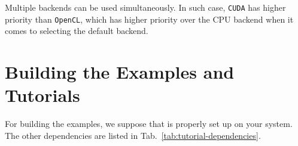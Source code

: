 
Multiple backends can be used simultaneously. In such case, \lstinline|CUDA| has higher priority than \lstinline|OpenCL|, which has higher priority over the CPU backend when it comes to selecting the default backend.


\section{Building the Examples and Tutorials}
For building the examples, we suppose that {\CMake} is properly set up
on your system. The other dependencies are listed in Tab.~\ref{tab:tutorial-dependencies}.

